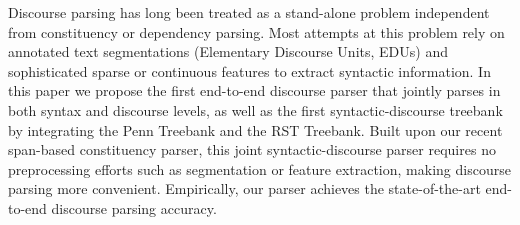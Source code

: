Discourse parsing has long been treated as a stand-alone problem independent from constituency or dependency parsing. Most attempts at this problem rely on annotated text segmentations (Elementary Discourse Units, EDUs) and sophisticated sparse or continuous features to extract syntactic information. In this paper we propose the first end-to-end discourse parser that jointly parses in both syntax and discourse levels, as well as the first syntactic-discourse treebank by integrating the Penn Treebank and the RST Treebank. Built upon our recent span-based constituency parser, this joint syntactic-discourse parser requires no preprocessing efforts such as segmentation or feature extraction, making discourse parsing more convenient. Empirically, our parser achieves the state-of-the-art end-to-end discourse parsing accuracy.

